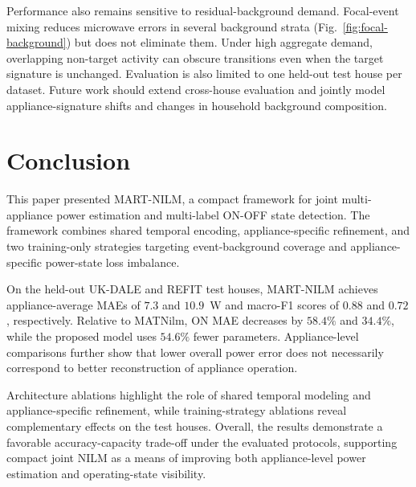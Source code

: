 \documentclass[journal]{IEEEtran}
\begin{document}
Performance also remains sensitive to residual-background demand. Focal-event mixing reduces microwave errors in several background strata (Fig.~\ref{fig:focal-background}) but does not eliminate them. Under high aggregate demand, overlapping non-target activity can obscure transitions even when the target signature is unchanged. Evaluation is also limited to one held-out test house per dataset. Future work should extend cross-house evaluation and jointly model appliance-signature shifts and changes in household background composition.

\section{Conclusion}

This paper presented MART-NILM, a compact framework for joint multi-appliance power estimation and multi-label ON-OFF state detection. The framework combines shared temporal encoding, appliance-specific refinement, and two training-only strategies targeting event-background coverage and appliance-specific power-state loss imbalance.

On the held-out UK-DALE and REFIT test houses, MART-NILM achieves appliance-average MAEs of $7.3$ and $10.9$~W and macro-F1 scores of $0.88$ and $0.72$, respectively. Relative to MATNilm, ON MAE decreases by $58.4\%$ and $34.4\%$, while the proposed model uses $54.6\%$ fewer parameters. Appliance-level comparisons further show that lower overall power error does not necessarily correspond to better reconstruction of appliance operation.

Architecture ablations highlight the role of shared temporal modeling and appliance-specific refinement, while training-strategy ablations reveal complementary effects on the test houses. Overall, the results demonstrate a favorable accuracy-capacity trade-off under the evaluated protocols, supporting compact joint NILM as a means of improving both appliance-level power estimation and operating-state visibility.



\end{document}
